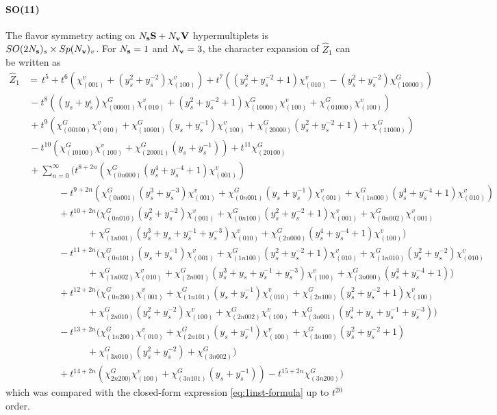 \documentclass[letterpaper, 11pt]{article}
\newcommand{\nn}{\nonumber}
\begin{document}
{\paragraph{SO(11)} The flavor symmetry acting on $N_{\bf s} \mathbf{S} + N_{\bf v} \mathbf{V}$ hypermultiplets is $SO(2N_{\bf s})_s \times  Sp(N_{\bf v})_v$. For $N_{\bf s}=1$ and  $N_{\bf v} = 3$, the character expansion of  $\hat{Z}_1$ can be written as
\begin{align}
  \label{eq:so11-s1v3}
\hat{Z}_1&=\,t^5+t^6(\chi^v_{(001)}+(y_s^2+y_s^{-2})\chi^v_{(100)})+t^7((y_s^2+y_s^{-2}+1)\chi^v_{(010)}-(y_s^{2}+y_s^{-2})\chi^G_{(10000)})\nn\\
&\,-t^8((y_s+y_s^{_1})\chi^G_{(00001)}\chi^v_{(010)}+(y_s^2+y_s^{-2}+1)\chi^G_{(10000)}\chi^v_{(100)}+\chi^G_{(01000)}\chi^v_{(100)})\nn\\
&\,+t^9(\chi^G_{(00100)}\chi^v_{(010)}+\chi^G_{(10001)}(y_s+y_s^{-1})\chi^v_{(100)}+\chi^G_{(20000)}(y_s^2+y_s^{-2}+1)+\chi^G_{(11000)})\nn\\
&\,-t^{10}(\chi^G_{(10100)}\chi^v_{(100)}+\chi^G_{(20001)}(y_s+y_s^{-1}))+t^{11}\chi^G_{(20100)}\\
&\,+\sum_{n=0}^{\infty}\Big(t^{8+2n}(\chi^G_{(0n000)}(y_s^4+y_s^{-4}+1)\chi^v_{(001)})\nn\\
&\quad\qquad\ -t^{9+2n}(\chi^G_{(0n001)}(y_s^3+y_s^{-3})\chi^v_{(001)}+\chi^G_{(0n001)}(y_s+y_s^{-1})\chi^v_{(001)}+\chi^G_{(1n000)}(y_s^4+y_s^{-4}+1)\chi^v_{(010)})\nn\\
&\qquad\quad\ +t^{10+2n}(\chi^G_{(0n010)}(y_s^2+y_s^{-2})\chi^v_{(001)}+\chi^G_{(0n100)}(y_s^2+y_s^{-2}+1)\chi^v_{(001)}+\chi^G_{(0n002)}\chi^v_{(001)}\nn\\
&\qquad\qquad\qquad\ +\chi^G_{(1n001)}(y_s^3+y_s+y_s^{-1}+y_s^{-3})\chi^v_{(010)}+\chi^G_{(2n000)}(y_s^4+y_s^{-4}+1)\chi^v_{(100)})\nn\\
&\qquad\quad\ -t^{11+2n}(\chi^G_{(0n101)}(y_s+y_s^{-1})\chi^v_{(001)}+\chi^G_{(1n100)}(y_s^2+y_s^{-2}+1)\chi^v_{(010)}+\chi^G_{(1n010)}(y_s^2+y_s^{-2})\chi^v_{(010)}\nn\\
&\qquad\qquad\qquad\ +\chi^G_{(1n002)}\chi^v_{(010)}+\chi^G_{(2n001)}(y_s^3+y_s+y_s^{-1}+y_s^{-3})\chi^v_{(100)}+\chi^G_{(3n000)}(y_s^4+y_s^{-4}+1))\nn\\
&\qquad\quad\ +t^{12+2n}(\chi^G_{(0n200)}\chi^v_{(001)}+\chi^G_{(1n101)}(y_s+y_s^{-1})\chi^v_{(010)}+\chi^G_{(2n100)}(y_s^2+y_s^{-2}+1)\chi^v_{(100)}\nn\\
&\qquad\qquad\qquad\ +\chi^G_{(2n010)}(y_s^2+y_s^{-2})\chi^v_{(100)}+\chi^G_{(2n002)}\chi^v_{(100)}+\chi^G_{(3n001)}(y_s^3+y_s+y_s^{-1}+y_s^{-3}))\nn\\
&\qquad\quad\ -t^{13+2n}(\chi^G_{(1n200)}\chi^v_{(010)}+\chi^G_{(2n101)}(y_s+y_s^{-1})\chi^v_{(100)}+\chi^G_{(3n100)}(y_s^2+y_s^{-2}+1)\nn\\
&\qquad\qquad\qquad\ +\chi^G_{(3n010)}(y_s^2+y_s^{-2})+\chi^G_{(3n002)})\nn\\
&\qquad\quad\ +t^{14+2n}(\chi^G_{2n200)}\chi^v_{(100)}+\chi^G_{(3n101)}(y_s+y_s^{-1}))-t^{15+2n}\chi^G_{(3n200)}\Big) \nn
\end{align}
which was compared with the closed-form expression \eqref{eq:1inst-formula} up to $t^{20}$ order.

}
\end{document}
